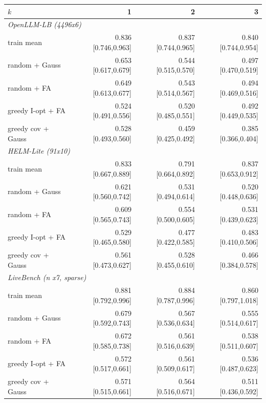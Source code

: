 \begin{tabular}{lrrr}\toprule
$k$ & 1 & 2 & 3 \\\midrule
\multicolumn{4}{l}{\textit{OpenLLM-LB (4496x6)}} \\
train mean & 0.836 \scriptsize[0.746,0.963] & 0.837 \scriptsize[0.744,0.965] & 0.840 \scriptsize[0.744,0.954] \\
random + Gauss & 0.653 \scriptsize[0.617,0.679] & 0.544 \scriptsize[0.515,0.570] & 0.497 \scriptsize[0.470,0.519] \\
random + FA & 0.649 \scriptsize[0.613,0.677] & 0.543 \scriptsize[0.514,0.567] & 0.494 \scriptsize[0.469,0.516] \\
greedy I-opt + FA & 0.524 \scriptsize[0.491,0.556] & 0.520 \scriptsize[0.485,0.551] & 0.492 \scriptsize[0.449,0.535] \\
greedy cov + Gauss & 0.528 \scriptsize[0.493,0.560] & 0.459 \scriptsize[0.425,0.492] & 0.385 \scriptsize[0.366,0.404] \\
\multicolumn{4}{l}{\textit{HELM-Lite (91x10)}} \\
train mean & 0.833 \scriptsize[0.667,0.889] & 0.791 \scriptsize[0.664,0.892] & 0.837 \scriptsize[0.653,0.912] \\
random + Gauss & 0.621 \scriptsize[0.560,0.742] & 0.531 \scriptsize[0.494,0.614] & 0.520 \scriptsize[0.448,0.636] \\
random + FA & 0.609 \scriptsize[0.565,0.743] & 0.554 \scriptsize[0.500,0.605] & 0.531 \scriptsize[0.439,0.623] \\
greedy I-opt + FA & 0.529 \scriptsize[0.465,0.580] & 0.477 \scriptsize[0.422,0.585] & 0.483 \scriptsize[0.410,0.506] \\
greedy cov + Gauss & 0.561 \scriptsize[0.473,0.627] & 0.528 \scriptsize[0.455,0.610] & 0.466 \scriptsize[0.384,0.578] \\
\multicolumn{4}{l}{\textit{LiveBench (n x7, sparse)}} \\
train mean & 0.881 \scriptsize[0.792,0.996] & 0.884 \scriptsize[0.787,0.996] & 0.860 \scriptsize[0.797,1.018] \\
random + Gauss & 0.679 \scriptsize[0.592,0.743] & 0.567 \scriptsize[0.536,0.634] & 0.555 \scriptsize[0.514,0.617] \\
random + FA & 0.672 \scriptsize[0.585,0.738] & 0.561 \scriptsize[0.516,0.639] & 0.538 \scriptsize[0.511,0.607] \\
greedy I-opt + FA & 0.572 \scriptsize[0.517,0.661] & 0.561 \scriptsize[0.509,0.617] & 0.536 \scriptsize[0.487,0.623] \\
greedy cov + Gauss & 0.571 \scriptsize[0.515,0.661] & 0.564 \scriptsize[0.516,0.671] & 0.511 \scriptsize[0.436,0.592] \\
\bottomrule\end{tabular}
